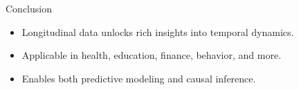 \documentclass{beamer}
\begin{document}
\begin{frame}{Conclusion}
\begin{itemize}
    \item Longitudinal data unlocks rich insights into temporal dynamics.
    \item Applicable in health, education, finance, behavior, and more.
    \item Enables both predictive modeling and causal inference.
\end{itemize}
\end{frame}
\end{document}

